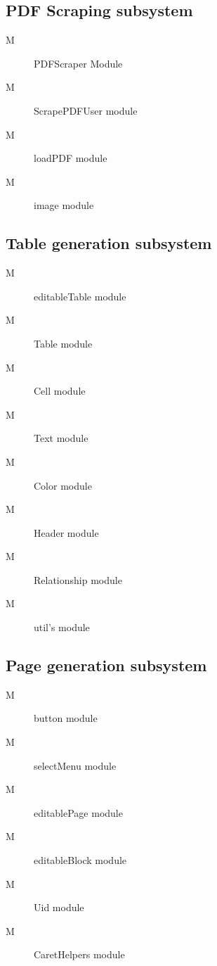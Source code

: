 \documentclass[12pt, titlepage]{article}
\newcounter{mnum}
\newcommand{\mthemnum}{M\themnum}
\begin{document}
\subsection{PDF Scraping subsystem}
\begin{description}
\item[ \mthemnum \label{M18}] PDFScraper Module 
\item[ \mthemnum \label{M16}] ScrapePDFUser module
\item[ \mthemnum \label{M15}] loadPDF module
\item[ \mthemnum \label{M17}] image module

\end{description}

\subsection{Table generation subsystem}
\begin{description}
\item[ \mthemnum \label{M6}] editableTable module
\item[ \mthemnum \label{M7}] Table module
\item[ \mthemnum \label{M8}] Cell module
\item[ \mthemnum \label{M9}] Text module
\item[ \mthemnum \label{M10}] Color module
\item[ \mthemnum \label{M11}] Header module
\item[ \mthemnum \label{M12}] Relationship module
\item[ \mthemnum \label{M13}] util’s module

\end{description}

\subsection{Page generation subsystem}
\begin{description}
\item[ \mthemnum \label{M15}] button module
\item[ \mthemnum \label{M15}] selectMenu module
\item[ \mthemnum \label{M15}] editablePage module
\item[ \mthemnum \label{M15}] editableBlock module
\item[ \mthemnum \label{M15}] Uid module
\item[ \mthemnum \label{M15}] CaretHelpers module

\end{description}
\end{document}
